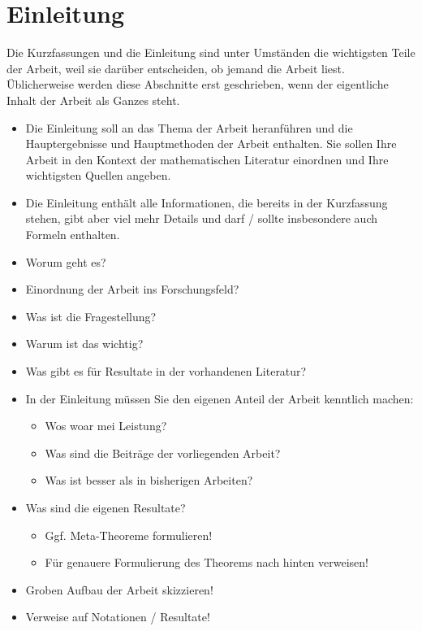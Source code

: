 \chapter{Einleitung}
\label{chapter:introduction}

\noindent
Die Kurzfassungen und die Einleitung sind unter Umständen die wichtigsten Teile der Arbeit, weil sie darüber entscheiden, ob jemand die Arbeit liest. Üblicherweise werden diese Abschnitte erst geschrieben, wenn der eigentliche Inhalt der Arbeit als Ganzes steht.

\begin{itemize}

    \item Die Einleitung soll an das Thema der Arbeit heranführen und die Hauptergebnisse und Hauptmethoden der Arbeit enthalten. Sie sollen Ihre Arbeit in den Kontext der mathematischen Literatur einordnen und Ihre wichtigsten Quellen angeben.

    \item Die Einleitung enthält alle Informationen, die bereits in der Kurzfassung stehen, gibt aber viel mehr Details und darf / sollte insbesondere auch Formeln enthalten.

    \item Worum geht es?
    \item Einordnung der Arbeit ins Forschungsfeld?
    \item Was ist die Fragestellung?
    \item Warum ist das wichtig?
    \item Was gibt es für Resultate in der vorhandenen Literatur?

    \item In der Einleitung müssen Sie den eigenen Anteil der Arbeit kenntlich machen:
          \begin{itemize}
              \item Wos woar mei Leistung?
              \item Was sind die Beiträge der vorliegenden Arbeit?
              \item Was ist besser als in bisherigen Arbeiten?
          \end{itemize}

    \item Was sind die eigenen Resultate?
          \begin{itemize}
              \item Ggf. Meta-Theoreme formulieren!
              \item Für genauere Formulierung des Theorems nach hinten verweisen!
          \end{itemize}

    \item Groben Aufbau der Arbeit skizzieren!
    \item Verweise auf Notationen / Resultate!
\end{itemize}